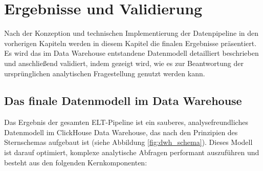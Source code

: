 \documentclass[
    12pt,               
    a4paper,        
    ngerman            
]{scrartcl}
\begin{document}
\section{Ergebnisse und Validierung}
\label{chap:ergebnisse}

Nach der Konzeption und technischen Implementierung der Datenpipeline in den vorherigen Kapiteln werden in diesem Kapitel die finalen Ergebnisse präsentiert. Es wird das im Data Warehouse entstandene Datenmodell detailliert beschrieben und anschließend validiert, indem gezeigt wird, wie es zur Beantwortung der ursprünglichen analytischen Fragestellung genutzt werden kann.

\subsection{Das finale Datenmodell im Data Warehouse}
\label{sec:finales_datenmodell}

Das Ergebnis der gesamten ELT-Pipeline ist ein sauberes, analysefreundliches Datenmodell im ClickHouse Data Warehouse, das nach den Prinzipien des Sternschemas aufgebaut ist (siehe Abbildung \ref{fig:dwh_schema}). Dieses Modell ist darauf optimiert, komplexe analytische Abfragen performant auszuführen und besteht aus den folgenden Kernkomponenten:
\end{document}
